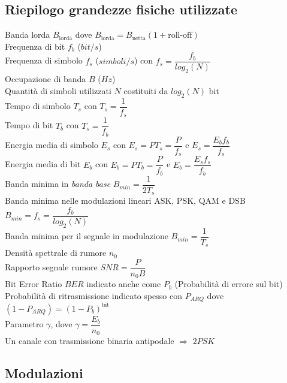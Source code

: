 \documentclass[10pt,a4paper]{article}
\begin{document}
\subsection{Riepilogo grandezze fisiche utilizzate}
\begin{description}

\item[Banda lorda $B_{\text{lorda}}$ dove $B_{\text{lorda}} = B_{\text{netta}}(1+\text{roll-off})$]
\item[Frequenza di bit $f_b$ ($bit/s$)] 
\item[Frequenza di simbolo $f_s$ ($simboli/s$) con $f_s=\dfrac{f_b}{log_2 (N)}$] 
\item[Occupazione di banda $B$ ($Hz$)] 
\item[Quantità di simboli utilizzati $N$ costituiti da $log_2(N)$ bit] 
\item[Tempo di simbolo $T_s$ con $T_s = \dfrac{1}{f_s}$] 
\item[Tempo di bit $T_b$ con $T_s = \dfrac{1}{f_b}$] 
\item[Energia media di simbolo $E_s$ con $E_s = PT_s = \dfrac{P}{f_s}$ e $E_s = \dfrac{E_b f_b}{f_s}$]
\item[Energia media di bit $E_b$ con $E_b = PT_b = \dfrac{P}{f_b}$ e $E_b = \dfrac{E_s f_s}{f_b}$]
\item[Banda minima in \textit{banda base} $B_{min} = \dfrac{1}{2T_s}$]
\item[Banda minima nelle modulazioni lineari ASK, PSK, QAM e DSB $B_{min} = f_s = \dfrac{f_b}{log_2 (N)}$]
\item[Banda minima per il segnale in modulazione $B_{min} = \dfrac{1}{T_s}$]
\item[Densità spettrale di rumore $n_0$]
\item[Rapporto segnale rumore $SNR = \dfrac{P}{n_0B}$]
\item[Bit Error Ratio $BER$ indicato anche come $P_b$ (Probabilità di errore sul bit)]
\item[Probabilità di ritrasmissione indicato spesso con $P_{ARQ}$ dove $(1-P_{ARQ})=(1-P_{b})^{\text{bit}}$]
\item[Parametro $\gamma$, dove $\gamma = \dfrac{E_b}{n_0}$]
\item[Un canale con trasmissione binaria antipodale $\Rightarrow$ $2PSK$]

\end{description}

\subsection{Modulazioni}
\end{document}
